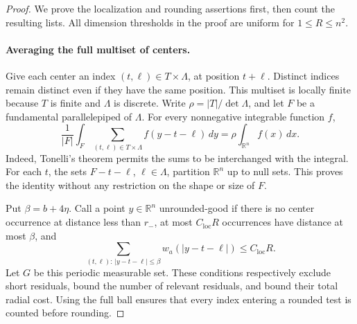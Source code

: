 \begin{proof}
We prove the localization and rounding assertions first, then count the
resulting lists.  All dimension thresholds in the proof are uniform for
$1\le R\le n^2$.

\paragraph{Averaging the full multiset of centers.}
Give each center an index $(t,\ell)\in T\times\Lambda$, at position
$t+\ell$.  Distinct indices remain distinct even if they have the same
position.  This multiset is locally finite because $T$ is finite and
$\Lambda$ is discrete.  Write $\rho=|T|/\det\Lambda$, and let $F$ be a
fundamental parallelepiped of $\Lambda$.  For every nonnegative integrable
function $f$,
\begin{equation}\label{eq:periodic-averaging}
 \frac1{|F|}\int_F
       \sum_{(t,\ell)\in T\times\Lambda} f(y-t-\ell)\,dy
       =\rho\int_{\mathbb R^n}f(x)\,dx.
\end{equation}
Indeed, Tonelli's theorem permits the sums to be interchanged with the
integral.  For each $t$, the sets $F-t-\ell$, $\ell\in\Lambda$, partition
$\mathbb R^n$ up to null sets.  This proves the identity without any
restriction on the shape or size of $F$.

Put $\beta=b+4\eta$.  Call a point $y\in\mathbb R^n$ unrounded-good if
there is no center occurrence at distance less than $r_-$, at most
$C_{\mathrm{loc}}R$ occurrences have distance at most $\beta$, and
\begin{equation}\label{eq:unrounded-weight}
 \sum_{(t,\ell):\,|y-t-\ell|\le\beta}
         w_a(|y-t-\ell|)\le C_{\mathrm{loc}}R.
\end{equation}
Let $G$ be this periodic measurable set.  These conditions respectively
exclude short residuals, bound the number of relevant residuals, and bound
their total radial cost.  Using the full ball ensures that every index
entering a rounded test is counted before rounding.


\end{proof}

